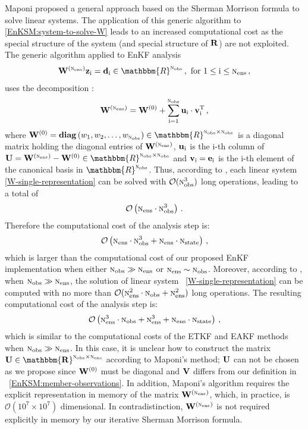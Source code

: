 \documentclass[12pt]{article}
\newcommand{\Nobs}{\textsc{n}_{{\rm obs}}}
\newcommand{\Nens}{\textsc{n}_{{\rm ens}}}
\newcommand{\Nstate}{\textsc{n}_{{\rm state}}}
\newcommand{\BO}{{\mathcal O}}
\newcommand{\R}{{\bf R}}
\newcommand{\z}[1]{{\bf z}_{{\rm #1}}}
\newcommand{\um}[1]{{\bf u}_{\rm #1}}
\renewcommand{\d}[1]{{\bf d}_{\rm #1}}
\newcommand{\W}[1]{{{\bf W}^{\left ( {\rm #1} \right )}}}
\newcommand{\V}{{\bf V}}
\renewcommand{\v}[1]{{\bf v}_{{\rm #1}}}
\renewcommand{\Re}{\mathbbm{R}}
\newcommand{\diag}[2]{{\bf diag} \left ( #1_{1}, #1_{2}, \ldots ,  #1_{#2}\right )}
\begin{document}
Maponi \cite{Maponi2007276} proposed a general approach based on the Sherman Morrison formula  to solve linear systems. The application of this generic algorithm 
to \eqref{EnKSM:system-to-solve-W} leads to an increased computational cost as the special structure of the system (and special structure of $\R$) are not exploited. The generic algorithm 
applied to EnKF analysis 
\begin{eqnarray}
\label{W-single-representation}
\displaystyle \W{\Nens} \z{i} = \d{i} \in \Re^{\Nobs}\, , \text{ for $1 \le \rm i \le \Nens$}\, ,
\end{eqnarray}
uses the decomposition \cite[Remark 1]{Maponi2007276}:
\begin{eqnarray*}
 \displaystyle \W{\Nens} = \W{0}+\sum_{\rm i=1}^{\Nobs} \um{\rm i} \cdot \v{\rm i}^{\rm T} \, ,
\end{eqnarray*}
where $\W{0}=\diag{w}{\Nobs} \in \Re^{\Nobs \times \Nobs}$ is a diagonal matrix holding the diagonal entries of $\W{\Nens}$, $\um{i}$ is the i-th column of ${\bf U} = \W{\Nens}-\W{0} \in \Re^{\Nobs \times \Nobs}$ and $\v{i}={\bf e}_{\rm i}$ is the i-th element of the canonical basis in $\Re^{\Nobs}$. Thus, according to \cite[Corollary 4]{Maponi2007276}, each linear system \eqref{W-single-representation} can be solved with $\BO(\Nobs^3)$ long operations, leading to a total of
\begin{eqnarray*}
 \displaystyle \BO\left( \Nens \cdot \Nobs^3 \right )\, .
\end{eqnarray*}
Therefore the computational cost of the analysis step is:
\begin{eqnarray}
\label{Maponi:computational-cost}
 \displaystyle \BO \left( \Nens \cdot \Nobs^3 + \Nens \cdot \Nstate \right )\, ,
\end{eqnarray}
which is larger than the computational cost of our proposed EnKF implementation when either $\Nobs \gg \Nens$ or $\Nens \sim \Nobs$. Moreover, according to \citep[Theorem 3]{Maponi2007276}, when $\Nobs \gg \Nens$, the solution of linear system ~\eqref{W-single-representation} can be computed with no more than $\BO( \Nens^2 \cdot \Nobs + \Nens^2)$ long operations. The resulting computational cost of the analysis step is:
\begin{eqnarray*}
 \displaystyle \BO \left( \Nens^3 \cdot \Nobs + \Nens^3 + \Nens \cdot \Nstate \right )\, ,
\end{eqnarray*}
which is similar to the computational costs of the ETKF and EAKF methods when $\Nobs \gg \Nens$. In this case, it is unclear how to construct the matrix $\bf U \in \Re^{\Nobs \times \Nens}$ according to Maponi's method; $\bf U$ can not be chosen as we propose since $\W{0}$ must be diagonal and $\V$ differs from our definition in ~\eqref{EnKSM:member-observations}. In addition, Maponi's algorithm requires the explicit representation in memory of the matrix $\W{\Nens}$, which, in practice, is $\BO(10^7 \times 10^{7})$ dimensional. In contradistinction, $\W{\Nens}$ is not required explicitly in memory by our iterative Sherman Morrison formula. 
\end{document}
